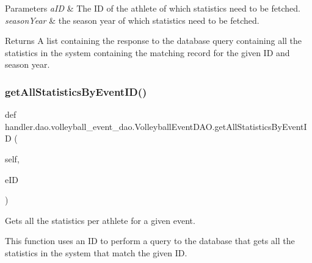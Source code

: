 \begin{DoxyParams}{Parameters}
{\em a\+ID} & The ID of the athlete of which statistics need to be fetched. \\
\hline
{\em season\+Year} & the season year of which statistics need to be fetched.\\
\hline
\end{DoxyParams}
\begin{DoxyReturn}{Returns}
A list containing the response to the database query containing all the statistics in the system containing the matching record for the given ID and season year. 
\end{DoxyReturn}
\mbox{\label{classhandler_1_1dao_1_1volleyball__event__dao_1_1_volleyball_event_d_a_o_a7fefc9189bb5e194897bf73d89324fe2}} 
\subsubsection{\texorpdfstring{get\+All\+Statistics\+By\+Event\+I\+D()}{getAllStatisticsByEventID()}}
{\footnotesize\ttfamily def handler.\+dao.\+volleyball\+\_\+event\+\_\+dao.\+Volleyball\+Event\+D\+A\+O.\+get\+All\+Statistics\+By\+Event\+ID (\begin{DoxyParamCaption}\item[{}]{self,  }\item[{}]{e\+ID }\end{DoxyParamCaption})}



Gets all the statistics per athlete for a given event. 

This function uses an ID to perform a query to the database that gets all the statistics in the system that match the given ID.


